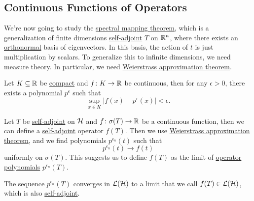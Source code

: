\subsection{Continuous Functions of Operators}
We're now going to study the \hyperref[thm:spectral-mapping]{spectral mapping theorem}, which is a generalization of finite dimensions \hyperref[def:self-adjoint-op]{self-adjoint} \(T\) on \(\mathbb{\MakeUppercase{r}} ^n\), where there exists an \hyperref[def:orthonormal-system]{orthonormal} basis of eigenvectors. In this basis, the action of \(t\) is just multiplication by scalars. To generalize this to infinite dimensions, we need measure theory. In particular, we need \hyperref[thm:Weierstrass-approximation]{Weierstrass approximation theorem}.

\begin{theorem}\label{thm:Weierstrass-approximation}
	Let \(K \subseteq \mathbb{\MakeUppercase{r}} \) be \hyperref[def:compact]{compact} and \(f\colon K \to \mathbb{\MakeUppercase{r}} \) be continuous, then for any \(\epsilon > 0\), there exists a polynomial \(p^{\epsilon } \) such that
	\[
		\sup_{x\in K} \vert f(x) - p^{\epsilon }(x)  \vert < \epsilon .
	\]
\end{theorem}

Let \(T\) be \hyperref[def:self-adjoint-op]{self-adjoint} on \(\mathcal{\MakeUppercase{h}} \) and \(f\colon \sigma (T) \to \mathbb{\MakeUppercase{r}} \) be a continuous function, then we can define a \hyperref[def:self-adjoint-op]{self-adjoint} operator \(f(T)\). Then we use \hyperref[thm:Weierstrass-approximation]{Weierstrass approximation theorem}, and we find polynomials \(p^{\epsilon _n}(t)\) such that
\[
	p^{\epsilon _n}(t) \to f(t)
\]
uniformly on \(\sigma (T)\). This suggests us to define \(f(T)\) as the limit of \hyperref[def:polynomial-op]{operator polynomials} \(p^{\epsilon _n}(T)\).

\begin{definition}\label{def:continuous-function-op}
	The sequence \(p^{\epsilon _n}(T)\) converges in \(\mathcal{\MakeUppercase{l}} (\mathcal{\MakeUppercase{h}} )\) to a limit that we call \(f(T)\in \mathcal{\MakeUppercase{l}} (\mathcal{\MakeUppercase{h}} )\), which is also \hyperref[def:self-adjoint-op]{self-adjoint}.
\end{definition}

